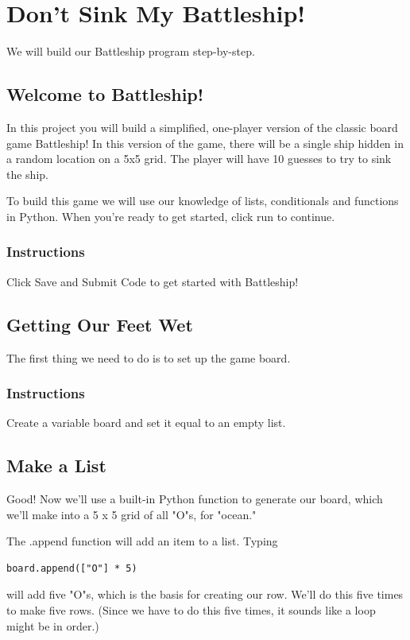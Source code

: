 \documentclass[12pt,a4paper,final,twoside,onecolumn,titlepage]{book}
\begin{document}
\section{Don't Sink My Battleship!}
We will build our Battleship program step-by-step.
\subsection{Welcome to Battleship!}

In this project you will build a simplified, one-player version of the classic board game Battleship! In this version of the game, there will be a single ship hidden in a random location on a 5x5 grid. The player will have 10 guesses to try to sink the ship.

To build this game we will use our knowledge of lists, conditionals and functions in Python. When you're ready to get started, click run to continue.
\subsubsection{Instructions}

Click Save and Submit Code to get started with Battleship!

\subsection{Getting Our Feet Wet}

The first thing we need to do is to set up the game board.
\subsubsection{Instructions}

Create a variable board and set it equal to an empty list.

\subsection{Make a List}

Good! Now we'll use a built-in Python function to generate our board, which we'll make into a 5 x 5 grid of all "O"s, for "ocean."

The .append function will add an item to a list. Typing
\begin{lstlisting}
board.append(["O"] * 5)
\end{lstlisting}
will add five "O"s, which is the basis for creating our row. We'll do this five times to make five rows. (Since we have to do this five times, it sounds like a loop might be in order.)
\end{document}
